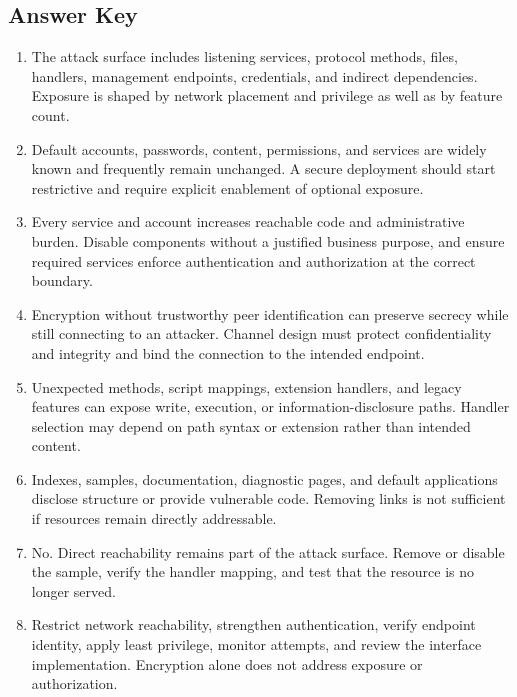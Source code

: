 \documentclass[11pt,letterpaper]{article}
\begin{document}
\subsection*{Answer Key}
\begin{enumerate}
\item The attack surface includes listening services, protocol methods, files, handlers, management endpoints, credentials, and indirect dependencies. Exposure is shaped by network placement and privilege as well as by feature count.
\item Default accounts, passwords, content, permissions, and services are widely known and frequently remain unchanged. A secure deployment should start restrictive and require explicit enablement of optional exposure.
\item Every service and account increases reachable code and administrative burden. Disable components without a justified business purpose, and ensure required services enforce authentication and authorization at the correct boundary.
\item Encryption without trustworthy peer identification can preserve secrecy while still connecting to an attacker. Channel design must protect confidentiality and integrity and bind the connection to the intended endpoint.
\item Unexpected methods, script mappings, extension handlers, and legacy features can expose write, execution, or information-disclosure paths. Handler selection may depend on path syntax or extension rather than intended content.
\item Indexes, samples, documentation, diagnostic pages, and default applications disclose structure or provide vulnerable code. Removing links is not sufficient if resources remain directly addressable.
\item No. Direct reachability remains part of the attack surface. Remove or disable the sample, verify the handler mapping, and test that the resource is no longer served.
\item Restrict network reachability, strengthen authentication, verify endpoint identity, apply least privilege, monitor attempts, and review the interface implementation. Encryption alone does not address exposure or authorization.
\end{enumerate}
\end{document}
